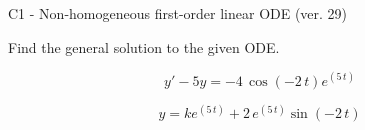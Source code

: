 \begin{exercise}
  \begin{exerciseTitle}C1 - Non-homogeneous first-order linear ODE (ver. 29)\end{exerciseTitle}
  \begin{exerciseStatement}
    
Find the general solution to the given ODE.

    
\[y'-5y= -4 \, \cos\left(-2 \, t\right) e^{\left(5 \, t\right)}\]

  \end{exerciseStatement}
  \begin{exerciseAnswer}
    
\[y= k e^{\left(5 \, t\right)} + 2 \, e^{\left(5 \, t\right)} \sin\left(-2 \, t\right)\]

  \end{exerciseAnswer}
\end{exercise}